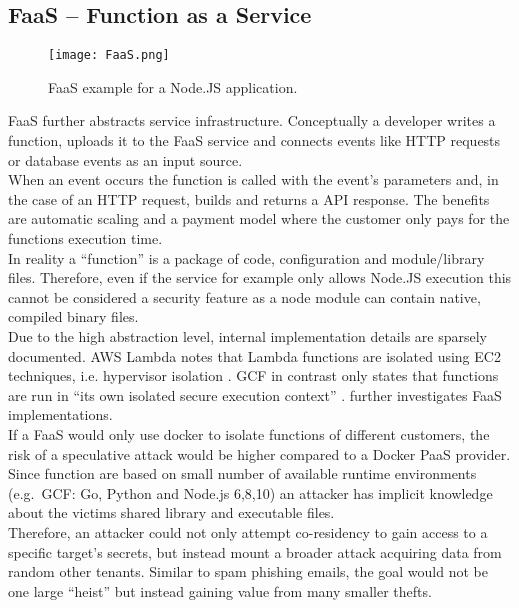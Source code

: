 \documentclass[conference,compsoc,final,a4paper]{IEEEtran}
\begin{document}
\subsection{\acs{FaaS} -- Function as a Service}
\begin{figure}[!ht]
\centering
\texttt{[image: FaaS.png]}
\caption{\ac{FaaS} example for a Node.JS application.}
\label{virtmem}
\end{figure}
\acs{FaaS} further abstracts service infrastructure. Conceptually a developer writes a function, uploads it to the \acs{FaaS} service and connects events like HTTP requests or
database events as an input source. \\
When an event occurs the function is called with the event's parameters and, in the case of an HTTP request, builds and
returns a API response. The benefits are automatic scaling and a payment model where the customer only pays for the functions execution time. \cite{lambdaFeatures}\\
In reality a \enquote{function} is a package of code, configuration and module/library files. Therefore, even if the service for example only allows Node.JS execution
this cannot be considered a security feature as a node module can contain native, compiled binary files. \cite{lambdaFaq} \\
Due to the high abstraction level, internal implementation details are sparsely documented. \ac{AWS} Lambda notes that Lambda functions are isolated using EC2 techniques, i.e.
hypervisor isolation \cite{lambdaFaq}. \ac{GCF} in contrast only states that functions are run in
\enquote{its own isolated secure execution context} \cite{cloudFunc}. \textcite{wang2018peeking} further investigates \acs{FaaS} implementations. \\
If a \acs{FaaS} would only use docker to isolate functions of different customers, the risk of a speculative attack would be higher compared to a Docker \ac{PaaS} provider. Since function are based on small number of available runtime environments (e.g.\ \ac{GCF}: Go, Python and Node.js 6,8,10) \cite{cloudFunc} an attacker has implicit knowledge
about the victims shared library and executable files. \\
Therefore, an attacker could not only attempt co-residency to gain access to a specific target's secrets, but instead mount a broader attack acquiring data from random
other tenants. Similar to spam phishing emails, the goal would not be one large \enquote{heist} but instead gaining value from many smaller thefts.
\end{document}
